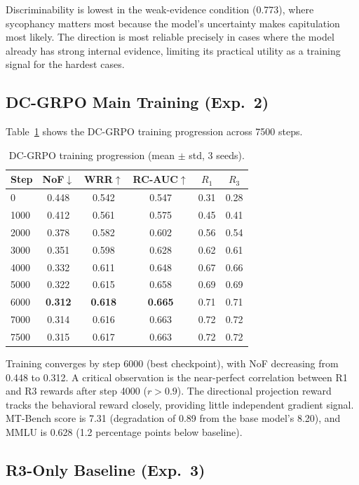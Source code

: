 \documentclass[11pt,a4paper]{article}
\begin{document}
Discriminability is lowest in the weak-evidence condition (0.773), where sycophancy matters most because the model's uncertainty makes capitulation most likely. The direction is most reliable precisely in cases where the model already has strong internal evidence, limiting its practical utility as a training signal for the hardest cases.

\subsection{DC-GRPO Main Training (Exp.\ 2)}
\label{sec:exp2}

Table~\ref{tab:dcgrpo_prog} shows the DC-GRPO training progression across 7500 steps.

\begin{table}[h]
\centering
\small
\caption{DC-GRPO training progression (mean $\pm$ std, 3 seeds).}
\label{tab:dcgrpo_prog}
\begin{tabular}{lccccc}
\toprule
Step & NoF$\downarrow$ & WRR$\uparrow$ & RC-AUC$\uparrow$ & $R_1$ & $R_3$ \\
\midrule
0    & 0.448 & 0.542 & 0.547 & 0.31 & 0.28 \\
1000 & 0.412 & 0.561 & 0.575 & 0.45 & 0.41 \\
2000 & 0.378 & 0.582 & 0.602 & 0.56 & 0.54 \\
3000 & 0.351 & 0.598 & 0.628 & 0.62 & 0.61 \\
4000 & 0.332 & 0.611 & 0.648 & 0.67 & 0.66 \\
5000 & 0.322 & 0.615 & 0.658 & 0.69 & 0.69 \\
6000 & \textbf{0.312} & \textbf{0.618} & \textbf{0.665} & 0.71 & 0.71 \\
7000 & 0.314 & 0.616 & 0.663 & 0.72 & 0.72 \\
7500 & 0.315 & 0.617 & 0.663 & 0.72 & 0.72 \\
\bottomrule
\end{tabular}
\end{table}

Training converges by step 6000 (best checkpoint), with NoF decreasing from 0.448 to 0.312. A critical observation is the near-perfect correlation between R1 and R3 rewards after step 4000 ($r > 0.9$). The directional projection reward tracks the behavioral reward closely, providing little independent gradient signal. MT-Bench score is 7.31 (degradation of 0.89 from the base model's 8.20), and MMLU is 0.628 (1.2 percentage points below baseline).

\subsection{R3-Only Baseline (Exp.\ 3)}
\label{sec:exp3}
\end{document}
